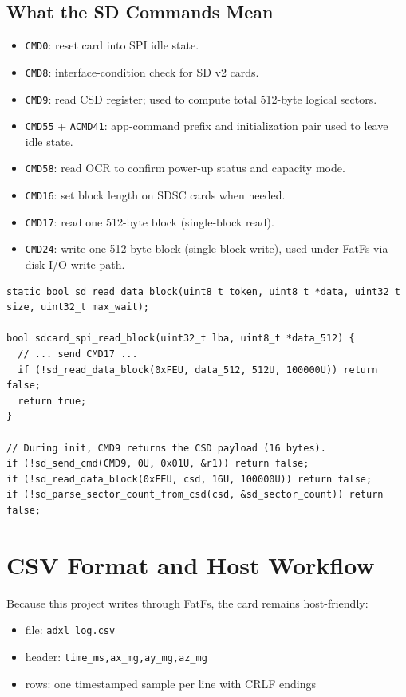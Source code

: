 \subsection*{What the SD Commands Mean}
\begin{itemize}[leftmargin=*]
\item \texttt{CMD0}: reset card into SPI idle state.
\item \texttt{CMD8}: interface-condition check for SD v2 cards.
\item \texttt{CMD9}: read CSD register; used to compute total 512-byte logical sectors.
\item \texttt{CMD55} + \texttt{ACMD41}: app-command prefix and initialization pair used to leave idle state.
\item \texttt{CMD58}: read OCR to confirm power-up status and capacity mode.
\item \texttt{CMD16}: set block length on SDSC cards when needed.
\item \texttt{CMD17}: read one 512-byte block (single-block read).
\item \texttt{CMD24}: write one 512-byte block (single-block write), used under FatFs via disk I/O write path.
\end{itemize}

\begin{lstlisting}[style=cstyle,caption={Read path in SPI mode (condensed)}]
static bool sd_read_data_block(uint8_t token, uint8_t *data, uint32_t size, uint32_t max_wait);

bool sdcard_spi_read_block(uint32_t lba, uint8_t *data_512) {
  // ... send CMD17 ...
  if (!sd_read_data_block(0xFEU, data_512, 512U, 100000U)) return false;
  return true;
}

// During init, CMD9 returns the CSD payload (16 bytes).
if (!sd_send_cmd(CMD9, 0U, 0x01U, &r1)) return false;
if (!sd_read_data_block(0xFEU, csd, 16U, 100000U)) return false;
if (!sd_parse_sector_count_from_csd(csd, &sd_sector_count)) return false;
\end{lstlisting}

\section{CSV Format and Host Workflow}

Because this project writes through FatFs, the card remains host-friendly:
\begin{itemize}[leftmargin=*]
\item file: \texttt{adxl\_log.csv}
\item header: \texttt{time\_ms,ax\_mg,ay\_mg,az\_mg}
\item rows: one timestamped sample per line with CRLF endings
\end{itemize}

